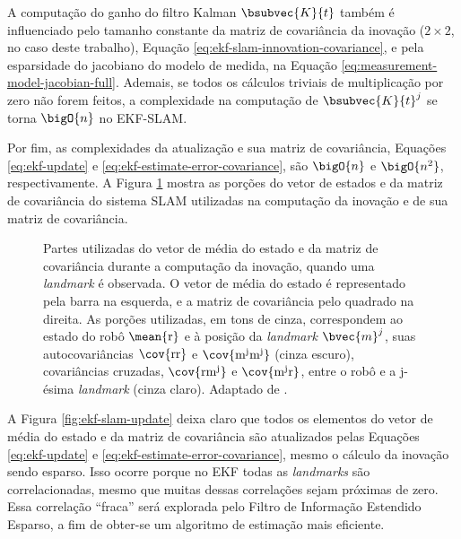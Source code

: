 A computação do ganho do filtro Kalman $\bsubvec{K}{t}$ também é influenciado pelo 
tamanho constante da matriz de covariância da inovação ($2\times 2$, no caso deste trabalho), Equação \ref{eq:ekf-slam-innovation-covariance}, e pela esparsidade do jacobiano do modelo de medida, na Equação \ref{eq:measurement-model-jacobian-full}. Ademais, se todos os cálculos triviais de multiplicação por zero não forem feitos, a complexidade na computação de $\bsubvec{K}{t}^j$ se torna $\bigO{n}$ no EKF-SLAM.

Por fim, as complexidades da atualização e sua matriz de covariância, Equações \ref{eq:ekf-update} e \ref{eq:ekf-estimate-error-covariance}, são $\bigO{n}$ e $\bigO{n^2}$, respectivamente. A Figura \ref{fig:ekf-slam-innovation} mostra as porções 
do vetor de estados e da matriz de covariância do sistema SLAM utilizadas na computação da inovação e de sua matriz de covariância.

\begin{figure}[h]
  \centering
  
  \caption[Elementos do vetor média e da matriz de covariância utilizados pelo Filtro de Kalman Estendido de um sistema SLAM na computação da inovação]{Partes utilizadas do vetor de média do estado e da matriz de covariância durante a computação da inovação, quando uma \textit{landmark} é observada. O vetor de média do estado é representado pela barra na esquerda, e a matriz de covariância pelo quadrado na direita. As porções utilizadas, em tons de cinza, correspondem ao estado do robô $\mean{\mathrm{r}}$ e à posição da \textit{landmark} $\bvec{m}^j$, suas autocovariâncias $\cov{\mathrm{rr}}$ e $\cov{\mathrm{m^j m^j}}$ (cinza escuro),  covariâncias cruzadas, $\cov{\mathrm{r m^j}}$ e $\cov{\mathrm{m^j r}}$, entre o robô e a j-ésima \textit{landmark} (cinza claro). Adaptado de \cite[p.~8]{jsola}.}
  \label{fig:ekf-slam-innovation}
\end{figure}

A Figura \ref{fig:ekf-slam-update} deixa claro que todos os elementos do vetor de média do estado e da 
matriz de covariância são atualizados pelas Equações \ref{eq:ekf-update} e \ref{eq:ekf-estimate-error-covariance}, mesmo o cálculo da inovação sendo esparso. Isso ocorre porque no EKF todas as \textit{landmarks} são 
correlacionadas, mesmo que muitas dessas correlações sejam próximas de zero. 
Essa correlação ``fraca'' será explorada pelo Filtro de Informação Estendido Esparso, a fim de obter-se um algoritmo de estimação mais eficiente.


